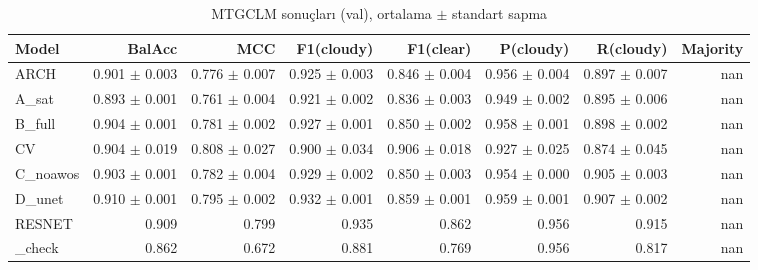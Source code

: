\begin{table}[ht]
\centering
\caption{MTGCLM sonuçları (val), ortalama $\pm$ standart sapma}
\label{tab:results_val}
\begin{tabular}{lrrrrrrr}
\hline
Model & BalAcc & MCC & F1(cloudy) & F1(clear) & P(cloudy) & R(cloudy) & Majority \\
\hline
ARCH & 0.901 $\pm$ 0.003 & 0.776 $\pm$ 0.007 & 0.925 $\pm$ 0.003 & 0.846 $\pm$ 0.004 & 0.956 $\pm$ 0.004 & 0.897 $\pm$ 0.007 & nan \\
A\_sat & 0.893 $\pm$ 0.001 & 0.761 $\pm$ 0.004 & 0.921 $\pm$ 0.002 & 0.836 $\pm$ 0.003 & 0.949 $\pm$ 0.002 & 0.895 $\pm$ 0.006 & nan \\
B\_full & 0.904 $\pm$ 0.001 & 0.781 $\pm$ 0.002 & 0.927 $\pm$ 0.001 & 0.850 $\pm$ 0.002 & 0.958 $\pm$ 0.001 & 0.898 $\pm$ 0.002 & nan \\
CV & 0.904 $\pm$ 0.019 & 0.808 $\pm$ 0.027 & 0.900 $\pm$ 0.034 & 0.906 $\pm$ 0.018 & 0.927 $\pm$ 0.025 & 0.874 $\pm$ 0.045 & nan \\
C\_noawos & 0.903 $\pm$ 0.001 & 0.782 $\pm$ 0.004 & 0.929 $\pm$ 0.002 & 0.850 $\pm$ 0.003 & 0.954 $\pm$ 0.000 & 0.905 $\pm$ 0.003 & nan \\
D\_unet & 0.910 $\pm$ 0.001 & 0.795 $\pm$ 0.002 & 0.932 $\pm$ 0.001 & 0.859 $\pm$ 0.001 & 0.959 $\pm$ 0.001 & 0.907 $\pm$ 0.002 & nan \\
RESNET & 0.909 & 0.799 & 0.935 & 0.862 & 0.956 & 0.915 & nan \\
\_check & 0.862 & 0.672 & 0.881 & 0.769 & 0.956 & 0.817 & nan \\
\hline
\end{tabular}
\end{table}
